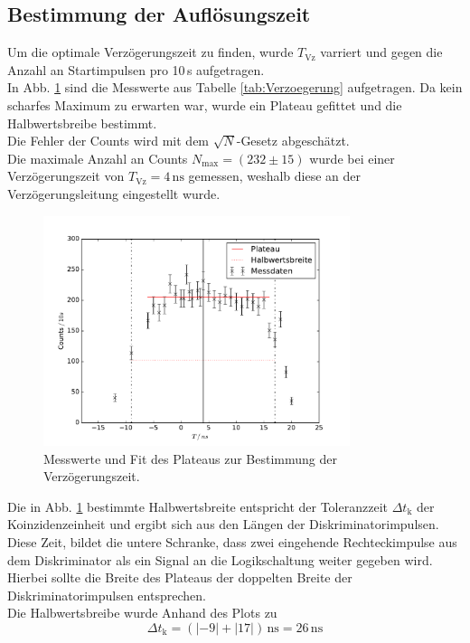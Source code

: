 \subsection{Bestimmung der Auflösungszeit}
Um die optimale Verzögerungszeit zu finden, wurde  $T_\text{Vz}$ varriert und gegen die Anzahl an Startimpulsen pro 10\,s aufgetragen.\\
In Abb. \ref{fig:Verzoegerung} sind die Messwerte aus Tabelle \ref{tab:Verzoegerung} aufgetragen. Da kein scharfes Maximum zu erwarten war,
wurde ein Plateau gefittet und die Halbwertsbreibe bestimmt.\\
Die Fehler der Counts wird mit dem $\sqrt{N}$-Gesetz abgeschätzt.\\
Die maximale Anzahl an Counts $N_{\text{max}}=(232\pm15)$ wurde bei einer Verzögerungszeit von $T_\text{Vz}=4\,\text{ns}$ gemessen, weshalb diese
an der Verzögerungsleitung eingestellt wurde.
\begin{figure}
  \centering
  \includegraphics[width=0.8\textwidth]{plots/plotVerzoegerung.pdf}
  \caption{Messwerte und Fit des Plateaus zur Bestimmung der Verzögerungszeit.}
  \label{fig:Verzoegerung}
\end{figure}
Die in Abb. \ref{fig:Verzoegerung} bestimmte Halbwertsbreite entspricht der Toleranzzeit $\Delta t_{\text{k}}$
der Koinzidenzeinheit und ergibt sich aus den Längen der Diskriminatorimpulsen. Diese Zeit,
 bildet die untere Schranke, dass zwei eingehende Rechteckimpulse aus dem Diskriminator als ein Signal an die Logikschaltung
 weiter gegeben wird. \\
Hierbei sollte die Breite des Plateaus der doppelten Breite der Diskriminatorimpulsen entsprechen.\\
Die Halbwertsbreibe wurde Anhand
des Plots zu
\begin{equation*}
  \Delta t_{\text{k}}=(|-9|+|17|)\,\text{ns}=26\,\text{ns}
\end{equation*}
